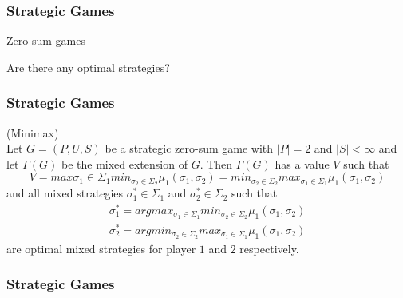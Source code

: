 \documentclass{beamer}
\begin{document}
\begin{frame}
  
  \frametitle{Strategic Games}

  Zero-sum games

\begin{table}[h!]
  \begin{center}
    \end{center}
  \end{table}

Are there any optimal strategies?

\end{frame}

\begin{frame}
  
\frametitle{Strategic Games}

\begin{theorem}(Minimax)\\
Let $G = (P,U,S)$ be a strategic zero-sum game with $|P| = 2$ and $|S|
< \infty$ and let $\Gamma (G)$ be the mixed extension of $G$. Then
$\Gamma (G)$ has a value $V$ such that
\begin{equation}
  V = max{\sigma _1 \in
  \Sigma_1} min_{\sigma _2 \in \Sigma_2} \mu_1(\sigma_1,\sigma_2) = min_{\sigma _2 \in
  \Sigma_2} max_{\sigma _1 \in \Sigma_1} \mu_1(\sigma_1,\sigma_2)
\end{equation}
and all mixed strategies $\sigma _1^* \in \Sigma_1$ and $\sigma _2^*
\in \Sigma_2$ such that
\begin{equation}
  \begin{gathered}
\sigma_1^* = argmax_{\sigma _1 \in
  \Sigma_1} min_{\sigma _2 \in \Sigma_2} \mu_1(\sigma_1,\sigma_2)\\
 \sigma_2^* = argmin_{\sigma _2 \in \Sigma_2} max_{\sigma _1 \in
   \Sigma_1} \mu_1(\sigma_1,\sigma_2)
\end{gathered}
\end{equation}
 are optimal mixed strategies for player $1$ and $2$ respectively.
\end{theorem}

\end{frame}

\begin{frame}
  
\frametitle{Strategic Games}

\end{frame}
\end{document}
